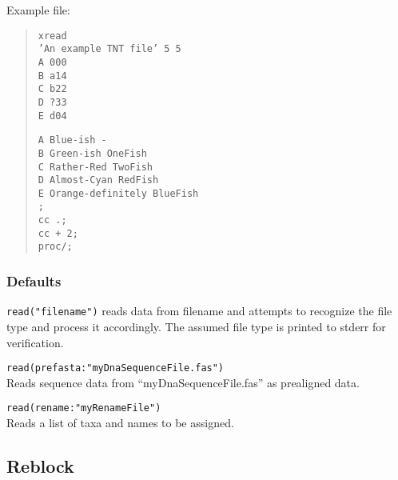 \begin{description}
		  Example file:
		  	\begin{quote}
			  	\texttt{xread\\
				  	'An example TNT file' 5 5\\
				  	A 000\\
				  	B a14\\
				  	C b22\\
				  	D ?33\\
				  	E d04\\}
			  	
			  	\texttt{A Blue-ish -\\
				  	B Green-ish OneFish\\
				  	C Rather-Red TwoFish\\
				  	D Almost-Cyan RedFish\\
				  	E Orange-definitely BlueFish\\
				  	;\\
				  	cc .;\\
				  	cc + 2;\\
				  	proc/;\\}
			  \end{quote}
	\end{description}	
		
	\subsubsection{Defaults}
		\texttt{read("filename")} reads data from filename and attempts to recognize the file type and 
		process it accordingly. The assumed file type is printed to stderr for verification.
		
	\begin{example}
		
		\item{\texttt{read(prefasta:"myDnaSequenceFile.fas")}\\ Reads sequence data from 
		``myDnaSequenceFile.fas'' as prealigned data.}
		
		\item{\texttt{read(rename:"myRenameFile")}\\ Reads a list of taxa and names to be assigned.} 
		
	\end{example}
		
\subsection{Reblock}
